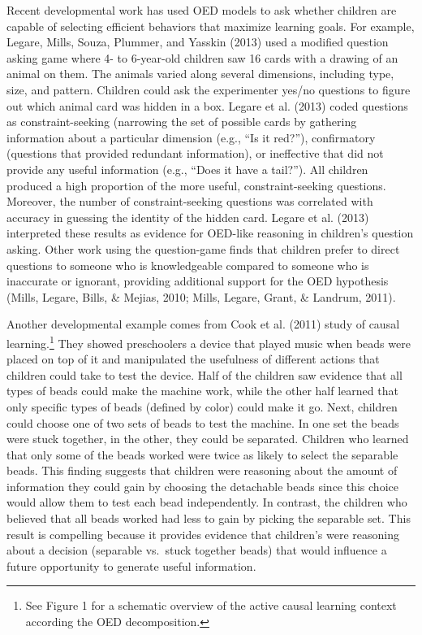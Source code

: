 \documentclass[english,floatsintext,man]{apa6}
\theoremstyle{definition}
\theoremstyle{definition}
\theoremstyle{definition}
\theoremstyle{remark}
\begin{document}
Recent developmental work has used OED models to ask whether children
are capable of selecting efficient behaviors that maximize learning
goals. For example, Legare, Mills, Souza, Plummer, and Yasskin (2013)
used a modified question asking game where 4- to 6-year-old children saw
16 cards with a drawing of an animal on them. The animals varied along
several dimensions, including type, size, and pattern. Children could
ask the experimenter yes/no questions to figure out which animal card
was hidden in a box. Legare et al. (2013) coded questions as
constraint-seeking (narrowing the set of possible cards by gathering
information about a particular dimension (e.g., \enquote{Is it red?}),
confirmatory (questions that provided redundant information), or
ineffective that did not provide any useful information (e.g.,
\enquote{Does it have a tail?}). All children produced a high proportion
of the more useful, constraint-seeking questions. Moreover, the number
of constraint-seeking questions was correlated with accuracy in guessing
the identity of the hidden card. Legare et al. (2013) interpreted these
results as evidence for OED-like reasoning in children's question
asking. Other work using the question-game finds that children prefer to
direct questions to someone who is knowledgeable compared to someone who
is inaccurate or ignorant, providing additional support for the OED
hypothesis (Mills, Legare, Bills, \& Mejias, 2010; Mills, Legare, Grant,
\& Landrum, 2011).

Another developmental example comes from Cook et al. (2011) study of
causal learning.\footnote{See Figure 1 for a schematic overview of the
  active causal learning context according the OED decomposition.} They
showed preschoolers a device that played music when beads were placed on
top of it and manipulated the usefulness of different actions that
children could take to test the device. Half of the children saw
evidence that all types of beads could make the machine work, while the
other half learned that only specific types of beads (defined by color)
could make it go. Next, children could choose one of two sets of beads
to test the machine. In one set the beads were stuck together, in the
other, they could be separated. Children who learned that only some of
the beads worked were twice as likely to select the separable beads.
This finding suggests that children were reasoning about the amount of
information they could gain by choosing the detachable beads since this
choice would allow them to test each bead independently. In contrast,
the children who believed that all beads worked had less to gain by
picking the separable set. This result is compelling because it provides
evidence that children's were reasoning about a decision (separable
vs.~stuck together beads) that would influence a future opportunity to
generate useful information.
\end{document}

